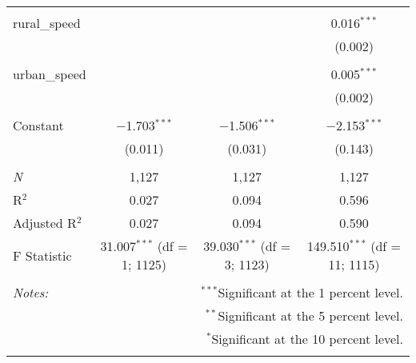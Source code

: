 \documentclass{article}
\begin{document}
\begin{table}[!htbp]
\begin{tabular}{@{\extracolsep{5pt}}lccc}
  & & & \\ 
 rural\_speed &  &  & 0.016$^{***}$ \\ 
  &  &  & (0.002) \\ 
  & & & \\ 
 urban\_speed &  &  & 0.005$^{***}$ \\ 
  &  &  & (0.002) \\ 
  & & & \\ 
 Constant & $-$1.703$^{***}$ & $-$1.506$^{***}$ & $-$2.153$^{***}$ \\ 
  & (0.011) & (0.031) & (0.143) \\ 
  & & & \\ 
\textit{N} & 1,127 & 1,127 & 1,127 \\ 
R$^{2}$ & 0.027 & 0.094 & 0.596 \\ 
Adjusted R$^{2}$ & 0.027 & 0.094 & 0.590 \\ 
F Statistic & 31.007$^{***}$ (df = 1; 1125) & 39.030$^{***}$ (df = 3; 1123) & 149.510$^{***}$ (df = 11; 1115) \\ 
\hline 
\hline \\[-1.8ex] 
\textit{Notes:} & \multicolumn{3}{r}{$^{***}$Significant at the 1 percent level.} \\ 
 & \multicolumn{3}{r}{$^{**}$Significant at the 5 percent level.} \\ 
 & \multicolumn{3}{r}{$^{*}$Significant at the 10 percent level.} \\ 
\normalsize 
\end{tabular} 
\end{table} 
\end{document}
